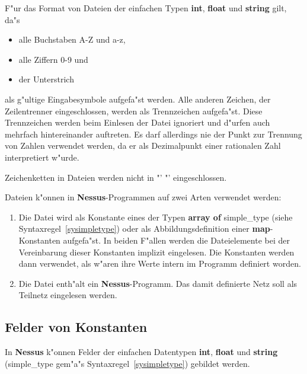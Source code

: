 F"ur das Format von Dateien der einfachen Typen {\bf int}, {\bf
float} und {\bf string} gilt, da"s

\begin{itemize}
\item alle Buchstaben A-Z und a-z,
\item alle Ziffern 0-9 und
\item der Unterstrich 
\end{itemize}

als g"ultige Eingabesymbole aufgefa"st werden. Alle anderen Zeichen,
 der Zeilentrenner eingeschlossen,
werden als Trennzeichen aufgefa"st. Diese
Trennzeichen werden beim Einlesen der Datei
 ignoriert und d"urfen auch mehrfach
hintereinander auftreten. Es darf allerdings nie der Punkt zur
Trennung von Zahlen verwendet werden, da
er als Dezimalpunkt einer rationalen Zahl interpretiert w"urde.

Zeichenketten in Dateien werden nicht in
"' "' eingeschlossen.

Dateien k"onnen in {\bf Nessus}-Programmen auf
zwei Arten verwendet werden:

\begin{enumerate}
\item Die Datei wird als Konstante eines
der Typen {\bf 	array of} simple\_type (siehe
Syntaxregel~\ref{sysimpletype}) oder als Abbildungsdefinition einer
{\bf 	map}-Konstanten aufgefa"st. In beiden F"allen
werden die 	Dateielemente bei der
Vereinbarung dieser Konstanten implizit eingelesen. Die Konstanten
werden dann verwendet, 	als w"aren ihre Werte intern im Programm
definiert worden.  

\item Die Datei enth"alt ein {\bf Nessus}-Programm.  Das damit
definierte Netz soll als Teilnetz
eingelesen werden.
\end{enumerate}


\subsection{Felder von Konstanten}
\label{KonstantenFelder}

In {\bf Nessus} k"onnen Felder der einfachen Datentypen
{\bf int}, {\bf float} und {\bf string}
 (simple\_type gem"a"s Syntaxregel~\ref{sysimpletype})
gebildet werden.

